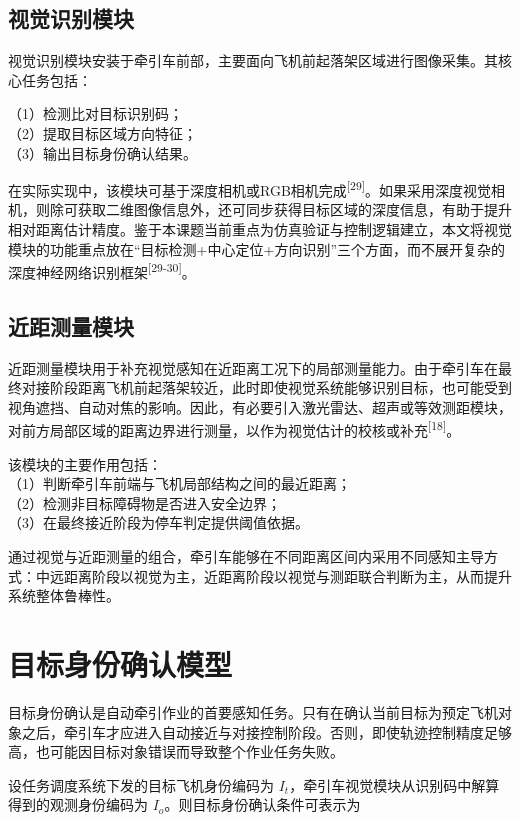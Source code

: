 \subsection{视觉识别模块}

视觉识别模块安装于牵引车前部，主要面向飞机前起落架区域进行图像采集。其核心任务包括：

（1）检测比对目标识别码；\\ （2）提取目标区域方向特征；\\ （3）输出目标身份确认结果。

在实际实现中，该模块可基于深度相机或RGB相机完成\textsuperscript{[29]}。如果采用深度视觉相机，则除可获取二维图像信息外，还可同步获得目标区域的深度信息，有助于提升相对距离估计精度。鉴于本课题当前重点为仿真验证与控制逻辑建立，本文将视觉模块的功能重点放在``目标检测+中心定位+方向识别''三个方面，而不展开复杂的深度神经网络识别框架\textsuperscript{[29-30]}。

\subsection{近距测量模块}

近距测量模块用于补充视觉感知在近距离工况下的局部测量能力。由于牵引车在最终对接阶段距离飞机前起落架较近，此时即使视觉系统能够识别目标，也可能受到视角遮挡、自动对焦的影响。因此，有必要引入激光雷达、超声或等效测距模块，对前方局部区域的距离边界进行测量，以作为视觉估计的校核或补充\textsuperscript{[18]}。

该模块的主要作用包括：\\ （1）判断牵引车前端与飞机局部结构之间的最近距离；\\ （2）检测非目标障碍物是否进入安全边界；\\ （3）在最终接近阶段为停车判定提供阈值依据。

通过视觉与近距测量的组合，牵引车能够在不同距离区间内采用不同感知主导方式：中远距离阶段以视觉为主，近距离阶段以视觉与测距联合判断为主，从而提升系统整体鲁棒性。

\section{目标身份确认模型}

目标身份确认是自动牵引作业的首要感知任务。只有在确认当前目标为预定飞机对象之后，牵引车才应进入自动接近与对接控制阶段。否则，即使轨迹控制精度足够高，也可能因目标对象错误而导致整个作业任务失败。

设任务调度系统下发的目标飞机身份编码为
\(I_{t}\)，牵引车视觉模块从识别码中解算得到的观测身份编码为
\(I_{o}\)。则目标身份确认条件可表示为

